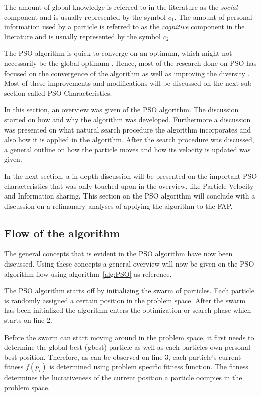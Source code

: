 The amount of global knowledge is referred to in the literature as the \emph{social} \label{def:socialcomponent} component \cite{FundamentalSwarm,CompuIntelligenceIntro,PSOSelfHierarch,SOSwarm} and is usually represented by the symbol $c_1$. The amount of personal information used by a particle is referred to as the \emph{cognitive} \label{def:cognitivecomponent} component in the literature and is usually represented by the symbol $c_2$\cite{FundamentalSwarm,CompuIntelligenceIntro,PSOSelfHierarch,SOSwarm}.

The PSO algorithm is quick to converge on an optimum, which might not necessarily be the global optimum \cite{PSOSelfHierarch}. Hence, most of the research done on PSO has focused on the convergence of the algorithm as well as improving the diversity \cite{FundamentalSwarm}. Most of these improvements and modifications will be discussed on the next sub section called PSO Characteristics.

In this section, an overview was given of the PSO algorithm. The discussion started on how and why the algorithm was developed. Furthermore a discussion was presented on what natural search procedure the algorithm incorporates and also how it is applied in the algorithm. After the search procedure was discussed, a general outline on how the particle moves and how its velocity is updated was given. 

In the next section, a in depth discussion will be presented on the important PSO characteristics that was only touched upon in the overview, like Particle Velocity and Information sharing. This section on the PSO algorithm will conclude with a discussion on a relimanary analyses of applying the algorithm to the FAP.
\subsection{Flow of the algorithm}
The general concepts that is evident in the PSO algorithm have now been discussed. Using these concepts a general overview will now be given on the PSO algorithm flow using algorithm~\ref{alg:PSO} as reference.

The PSO algorithm starts off by initializing the swarm of particles. Each particle is randomly assigned a certain position in the problem space. After the swarm has been initialized the algorithm enters the optimization or search phase which starts on line 2.

Before the swarm can start moving around in the problem space, it first needs to determine the global best (gbest) particle as well as each particles own personal best position. Therefore, as can be observed on line 3, each particle's current fitness $f(p_i)$ is determined using problem specific fitness function. The fitness determines the lucrativeness of the current position a particle occupies in the problem space.

